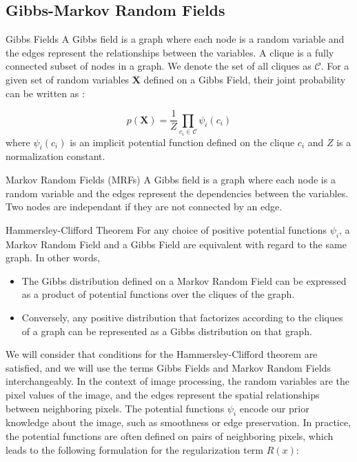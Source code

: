 \subsection{Gibbs-Markov Random Fields}

\begin{definition}{Gibbs Fields}
A Gibbs field is a graph where each node is a random variable and the edges represent the relationships between the variables.
A clique is a fully connected subset of nodes in a graph. We denote the set of all cliques as $\mathcal{C}$.
For a given set of random variables $\mathbf{X}$ defined on a Gibbs Field, their joint probability can be written as :

\begin{equation}
    p(\mathbf{X}) = \frac{1}{Z} \prod_{c_i \in \mathcal{C}} \psi_i(c_i)
\end{equation}
where $\psi_i(c_i)$ is an implicit potential function defined on the clique $c_i$ and $Z$ is a normalization constant.
\end{definition}


\begin{definition}{Markov Random Fields (MRFs)}
    A Gibbs field is a graph where each node is a random variable and the edges represent the dependencies between the variables. Two nodes are independant if they are not connected by an edge.
\end{definition}


\begin{theorem}{Hammersley-Clifford Theorem}
    For any choice of positive potential functions $\psi_i$, a Markov Random Field and a Gibbs Field are equivalent with regard to the same graph.
    In other words,
    \begin{itemize}
        \item The Gibbs distribution defined on a Markov Random Field can be expressed as a product of potential functions over the cliques of the graph.
        \item Conversely, any positive distribution that factorizes according to the cliques of a graph can be represented as a Gibbs distribution on that graph.
    \end{itemize} 
\end{theorem}

We will consider that conditions for the Hammersley-Clifford theorem are satisfied, and we will use the terms Gibbs Fields and Markov Random Fields interchangeably.
In the context of image processing, the random variables are the pixel values of the image, and the edges represent the spatial relationships between neighboring pixels. The potential functions $\psi_i$ encode our prior knowledge about the image, such as smoothness or edge preservation.
In practice, the potential functions are often defined on pairs of neighboring pixels, which leads to the following formulation for the regularization term $R(x)$:

